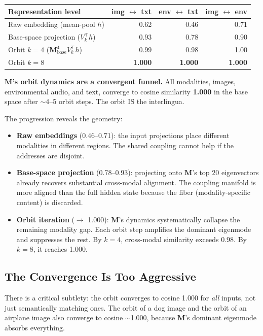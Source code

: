 \documentclass[11pt, a4paper]{article}
\newcommand{\M}{\mathbf{M}}
\theoremstyle{plain}
\theoremstyle{remark}
\begin{document}
\begin{center}\small
\begin{tabular}{@{}lrrr@{}}
\toprule
\textbf{Representation level} & \textbf{img $\leftrightarrow$ txt} & \textbf{env $\leftrightarrow$ txt} & \textbf{img $\leftrightarrow$ env} \\
\midrule
Raw embedding (mean-pool $h$) & 0.62 & 0.46 & 0.71 \\
Base-space projection ($V_k^\top h$) & 0.93 & 0.78 & 0.90 \\
Orbit $k{=}4$ ($\M_{\text{base}}^4 V_k^\top h$) & 0.99 & 0.98 & 1.00 \\
Orbit $k{=}8$ & \textbf{1.000} & \textbf{1.000} & \textbf{1.000} \\
\bottomrule
\end{tabular}
\end{center}

\textbf{$\M$'s orbit dynamics are a convergent funnel.}
All modalities, images, environmental audio, and text, converge to cosine similarity \textbf{1.000} in the base space after $\sim$4--5 orbit steps.
The orbit IS the interlingua.

The progression reveals the geometry:
\begin{itemize}[nosep]
    \item \textbf{Raw embeddings} (0.46--0.71): the input projections place different modalities in different regions.
    The shared coupling cannot help if the addresses are disjoint.
    \item \textbf{Base-space projection} (0.78--0.93): projecting onto $\M$'s top 20 eigenvectors already recovers substantial cross-modal alignment.
    The coupling manifold is more aligned than the full hidden state because the fiber (modality-specific content) is discarded.
    \item \textbf{Orbit iteration} ($\to$ 1.000): $\M$'s dynamics systematically collapse the remaining modality gap.
    Each orbit step amplifies the dominant eigenmode and suppresses the rest.
    By $k{=}4$, cross-modal similarity exceeds 0.98.
    By $k{=}8$, it reaches 1.000.
\end{itemize}

\subsection{The Convergence Is Too Aggressive}

There is a critical subtlety: the orbit converges to cosine 1.000 for \emph{all} inputs, not just semantically matching ones.
The orbit of a dog image and the orbit of an airplane image also converge to cosine $\sim$1.000, because $\M$'s dominant eigenmode absorbs everything.
\end{document}
